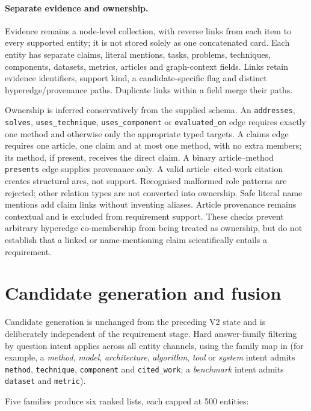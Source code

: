 \documentclass[11pt,a4paper]{article}
\begin{document}
\paragraph{Separate evidence and ownership.} Evidence remains a node-level collection, with reverse links from each item to every supported entity; it is not stored solely as one concatenated card. Each entity has separate claims, literal mentions, tasks, problems, techniques, components, datasets, metrics, articles and graph-context fields. Links retain evidence identifiers, support kind, a candidate-specific flag and distinct hyperedge/provenance paths. Duplicate links within a field merge their paths.

Ownership is inferred conservatively from the supplied schema. An \texttt{addresses}, \texttt{solves}, \texttt{uses\_technique}, \texttt{uses\_component} or \texttt{evaluated\_on} edge requires exactly one method and otherwise only the appropriate typed targets. A claims edge requires one article, one claim and at most one method, with no extra members; its method, if present, receives the direct claim. A binary article--method \texttt{presents} edge supplies provenance only. A valid article--cited-work citation creates structural arcs, not support. Recognised malformed role patterns are rejected; other relation types are not converted into ownership. Safe literal name mentions add claim links without inventing aliases. Article provenance remains contextual and is excluded from requirement support. These checks prevent arbitrary hyperedge co-membership from being treated as ownership, but do not establish that a linked or name-mentioning claim scientifically entails a requirement.

\section{Candidate generation and fusion}
\label{sec:candidates}

Candidate generation is unchanged from the preceding V2 state and is deliberately independent of the requirement stage. Hard answer-family filtering by question intent applies across all entity channels, using the family map in  (for example, a \emph{method}, \emph{model}, \emph{architecture}, \emph{algorithm}, \emph{tool} or \emph{system} intent admits \texttt{method}, \texttt{technique}, \texttt{component} and \texttt{cited\_work}; a \emph{benchmark} intent admits \texttt{dataset} and \texttt{metric}).

Five families produce six ranked lists, each capped at 500 entities:
\end{document}
